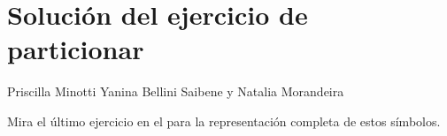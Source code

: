 \chapter{Solución del ejercicio de particionar}\label{s:chunking}

\begin{reveiwer}
{Priscilla Minotti}
{Yanina Bellini Saibene y Natalia Morandeira}
\end{reveiwer}


Mira el último ejercicio en el  para la representación completa de estos símbolos.

